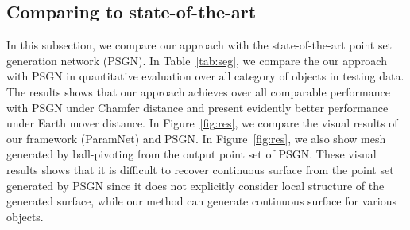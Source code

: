 \subsection{Comparing to state-of-the-art}
In this subsection, we compare our approach with the state-of-the-art point set generation network (PSGN)\cite{PSGN}. In Table~\ref{tab:seg}, we compare the our approach with PSGN\cite{PSGN} in quantitative evaluation over all category of objects in testing data. The results shows that our approach achieves over all comparable performance with PSGN\cite{PSGN} under Chamfer distance and present evidently better performance under Earth mover distance. 
In Figure~\ref{fig:res}, we compare the visual results of our framework (ParamNet) and PSGN\cite{PSGN}. In Figure~\ref{fig:res}, we also show mesh generated by ball-pivoting\cite{ballpivot} from the output point set of PSGN\cite{PSGN}. These visual results shows that it is difficult to recover continuous surface from the point set generated by PSGN\cite{PSGN} since it does not explicitly consider local structure of the generated surface, while our method can generate continuous surface for various objects.
